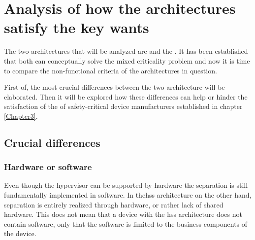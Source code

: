 
\chapter{Analysis of how the architectures satisfy the key wants} %

\label{Chapter4} %




The two  architectures that will be analyzed are  and the . It has been established that both can conceptually solve the mixed criticality problem and now it is time to compare the non-functional criteria of the architectures in question. 

First of, the most crucial differences between the two architecture will be elaborated. Then it will be explored how these differences can help or hinder the satisfaction of the  of safety-critical device manufacturers established in chapter \ref{Chapter3}. 

\section{Crucial differences}
\subsection{Hardware or software}
Even though the hypervisor can be supported by hardware the separation is still fundamentally implemented in software. In the\acrshort{hss} architecture on the other hand, separation is entirely realized through hardware, or rather lack of shared hardware. This does not mean that a device with the \acrshort{hss} architecture does not contain software, only that the software is limited to the business components of the device.

